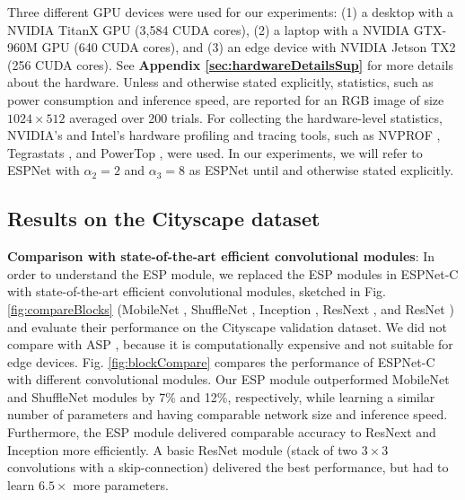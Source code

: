 \documentclass[runningheads]{llncs}
\def\Fig{Fig. }
\begin{document}
Three different GPU devices were used for our experiments: (1) a  desktop with a NVIDIA TitanX GPU (3,584 CUDA cores), (2) a laptop with a NVIDIA GTX-960M GPU (640 CUDA cores), and (3) an edge device with NVIDIA Jetson TX2 (256 CUDA cores). See \textbf{Appendix \ref{sec:hardwareDetailsSup}} for more details about the hardware. Unless and otherwise stated explicitly, statistics, such as power consumption and inference speed, are reported for an RGB image of size $1024 \times 512$ averaged over 200 trials. For collecting the hardware-level statistics, NVIDIA's and Intel's hardware profiling and tracing tools, such as NVPROF \cite{nvprof}, Tegrastats \cite{tegra}, and PowerTop \cite{powertop}, were used. In our  experiments, we will refer to ESPNet with $\alpha_2=2$ and $\alpha_3=8$ as ESPNet until and otherwise stated explicitly. 

\subsection{Results on the Cityscape dataset}
\label{ssec:sotaCity}

\noindent \textbf{Comparison with state-of-the-art efficient convolutional modules}: In order to understand the ESP module, we replaced the ESP modules in ESPNet-C with state-of-the-art efficient convolutional modules, sketched in \Fig \ref{fig:compareBlocks} (MobileNet \cite{howard2017mobilenets}, ShuffleNet \cite{zhang2017shufflenet}, Inception \cite{szegedy2015going,szegedy2016rethinking,SzegedyIV16InceptionV4}, ResNext \cite{xie2017aggregated}, and ResNet \cite{he2016deep}) and evaluate their  performance on the Cityscape validation dataset. We did not compare with ASP \cite{chen2016deeplab}, because it is computationally expensive and not suitable for edge devices. \Fig \ref{fig:blockCompare} compares the performance of ESPNet-C with different convolutional modules. Our ESP module outperformed  MobileNet and ShuffleNet modules by 7\% and 12\%, respectively, while learning a similar number of parameters and having comparable network size and inference speed. Furthermore, the ESP module delivered comparable accuracy to ResNext and Inception more efficiently. A basic ResNet module (stack of two $3\times 3$ convolutions with a skip-connection) delivered the best performance, but had to learn $6.5\times$ more parameters.
\end{document}
